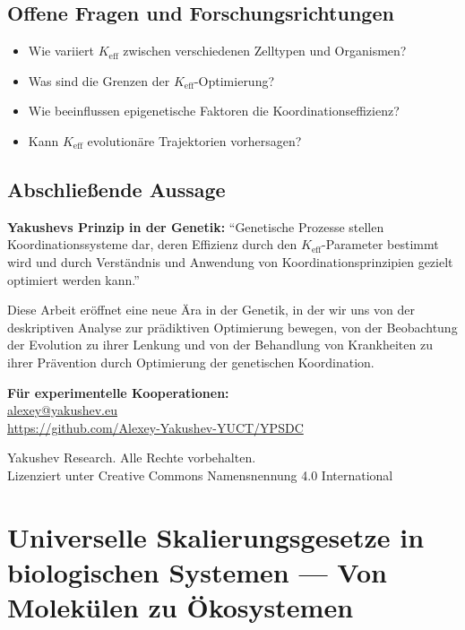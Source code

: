 \documentclass[12pt]{article}
\begin{document}
	\subsection{Offene Fragen und Forschungsrichtungen}
	
	\begin{itemize}
		\item Wie variiert $K_{\text{eff}}$ zwischen verschiedenen Zelltypen und Organismen?
		\item Was sind die Grenzen der $K_{\text{eff}}$-Optimierung?
		\item Wie beeinflussen epigenetische Faktoren die Koordinationseffizienz?
		\item Kann $K_{\text{eff}}$ evolutionäre Trajektorien vorhersagen?
	\end{itemize}
	
	\subsection{Abschließende Aussage}
	
	\textbf{Yakushevs Prinzip in der Genetik:}
	``Genetische Prozesse stellen Koordinationssysteme dar, deren Effizienz durch den $K_{\text{eff}}$-Parameter bestimmt wird und durch Verständnis und Anwendung von Koordinationsprinzipien gezielt optimiert werden kann.''
	
	Diese Arbeit eröffnet eine neue Ära in der Genetik, in der wir uns von der deskriptiven Analyse zur prädiktiven Optimierung bewegen, von der Beobachtung der Evolution zu ihrer Lenkung und von der Behandlung von Krankheiten zu ihrer Prävention durch Optimierung der genetischen Koordination.
	
	\begin{center}
		\vspace{1cm}
		\textbf{Für experimentelle Kooperationen:}\\
		\url{alexey@yakushev.eu}\\
		\url{https://github.com/Alexey-Yakushev-YUCT/YPSDC}
		
		\vspace{0.5cm}
		 Yakushev Research. Alle Rechte vorbehalten.\\
		Lizenziert unter Creative Commons Namensnennung 4.0 International
	\end{center}
	
	\section{Universelle Skalierungsgesetze in biologischen Systemen — Von Molekülen zu Ökosystemen}
	\label{sec:bio-scaling}
	
\end{document}
